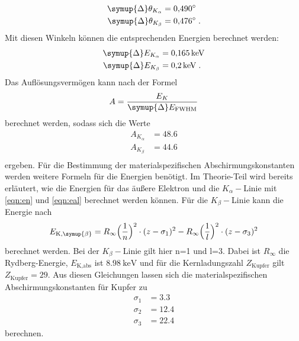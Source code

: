 \begin{align}
  \symup{\Delta}\theta_{K_\alpha} &= \SI{0.490}{\degree} \\
  \symup{\Delta}\theta_{K_\beta}  &= \SI{0.476}{\degree} \; .
\end{align}
\noindent
Mit diesen Winkeln können die entsprechenden Energien berechnet werden:
\begin{align}
  \symup{\Delta}E_{K_\alpha} &= \SI{0.165}{\kilo\electronvolt} \\
  \symup{\Delta}E_{K_\beta}  &= \SI{0.2}{\kilo\electronvolt} \; .
\end{align}
\noindent 
Das Auflösungsvermögen kann nach der Formel
\begin{equation*}
    A = \frac{E_K}{\symup{\Delta}E_{\text{FWHM}}}
\end{equation*}
berechnet werden, sodass sich die Werte
\begin{align*}
    A_{K_\alpha} &= \num{48.6} \\
    A_{K_\beta}  &= \num{44.6} \\
\end{align*}
ergeben. \newline
Für die Bestimmung der materialspezifischen Abschirmungskonstanten werden weitere Formeln für die Energien benötigt.
Im Theorie-Teil wird bereits erläutert, wie die Energien für das äußere Elektron und die $K_\alpha-$Linie mit \autoref{eqn:en} und \autoref{eqn:eal} berechnet werden können. Für die $K_\beta-$Linie kann die Energie nach
\begin{equation}
\label{eqn:ebeta}
E_{\text{K},\symup{\beta}} = R_\infty \Bigl(\frac{1}{n}\Bigr)^2 \cdot (z - \sigma_1)^2 - R_\infty \Bigl(\frac{1}{l}\Bigr)^2 \cdot (z - \sigma_3)^2
\end{equation}
berechnet werden. Bei der $K_\beta-$Linie gilt hier n=1 und l=3. 
Dabei ist $R_\infty$ die Rydberg-Energie, $E_\text{K,abs}$ ist $\SI{8.98}{\kilo\electronvolt}$\cite{wissen} und für die Kernladungszahl $Z_\text{Kupfer}$ gilt $Z_\text{Kupfer} = 29$. Aus diesen Gleichungen lassen sich die materialspezifischen Abschirmungskonstanten für Kupfer zu 
\begin{align*}
  \sigma_1 &= 3.3 \\
  \sigma_2 &= 12.4\\
  \sigma_3 &= 22.4
\end{align*}
berechnen.

